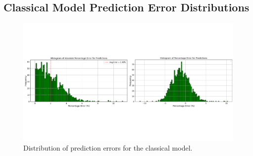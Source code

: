 \documentclass[10pt]{article}
\begin{document}
\subsection{Classical Model Prediction Error Distributions}
\label{appendix:classical error-hists}

\begin{figure}[H]
    \centering
    \includegraphics[trim=0cm 6cm -6cm 6cm,clip,width=1\paperwidth]{images/classical error hists.png}
    \caption{Distribution of prediction errors for the classical model.}
\end{figure}


\newpage


\end{document}
